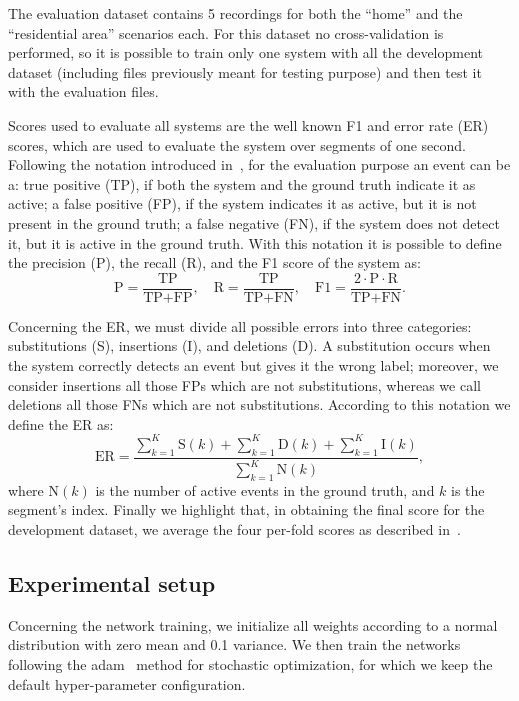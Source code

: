 The evaluation dataset contains 5 recordings for both the ``home'' and the ``residential area'' scenarios each. For this dataset no cross-validation is performed, so it is possible to train only one system with all the development dataset (including files previously meant for testing purpose) and then test it with the evaluation files.

Scores used to evaluate all systems are the well known F1 and error rate (ER) scores, which are used to evaluate the system over segments of one second. Following the notation introduced in~\cite{mesaros2016tut}, for the evaluation purpose an event can be a: true positive (TP), if both the system and the ground truth indicate it as active; a false positive (FP), if the system indicates it as active, but it is not present in the ground truth; a false negative (FN), if the system does not detect it, but it is active in the ground truth. With this notation it is possible to define the precision (P), the recall (R), and the F1 score of the system as:
\begin{equation}
\text{P}=\frac{\text{TP}}{\text{TP}+\text{FP}}, \quad \text{R}=\frac{\text{TP}}{\text{TP}+\text{FN}}, \quad \text{F1}=\frac{2 \cdot \text{P} \cdot \text{R}}{\text{TP}+\text{FN}}.
\end{equation}

Concerning the ER, we must divide all possible errors into three categories: substitutions (S), insertions (I), and deletions (D). A substitution occurs when the system correctly detects an event but gives it the wrong label; moreover, we consider insertions all those FPs which are not substitutions, whereas we call deletions all those FNs which are not substitutions. According to this notation we define the ER as:
\begin{equation}
\text{ER} = \frac{\sum_{k=1}^{K} \text{S}(k) + \sum_{k=1}^{K} \text{D}(k) + \sum_{k=1}^{K} \text{I}(k)}{\sum_{k=1}^{K} \text{N}(k)},
\end{equation}
where $\text{N}(k)$ is the number of active events in the ground truth, and $k$ is the segment's index. Finally we highlight that, in obtaining the final score for the development dataset, we average the four per-fold scores as described in~\cite{mesaros2016tut}.

\subsection{Experimental setup}

Concerning the network training, we initialize all weights according to a normal distribution with zero mean and 0.1 variance. We then train the networks following the adam~\cite{kingma2014adam} method for stochastic optimization, for which we keep the default hyper-parameter configuration.

